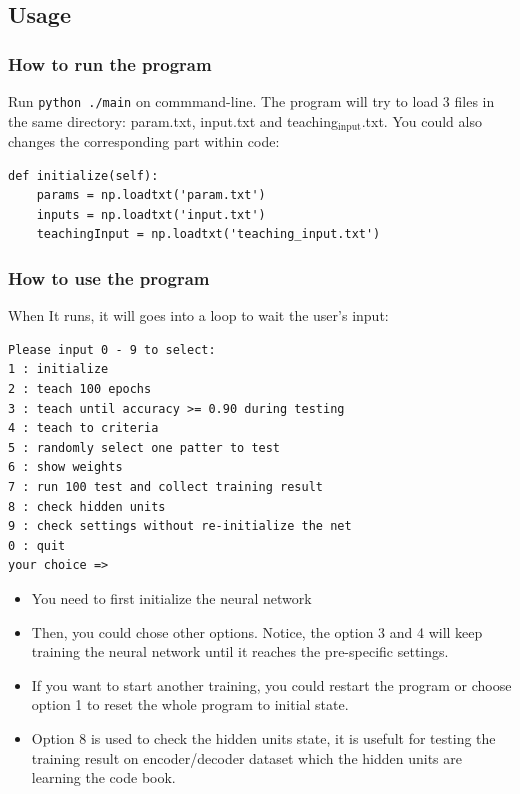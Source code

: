 \documentclass[11pt]{article}
\begin{document}
\subsection{Usage}
\label{sec-5-2}
\subsubsection{How to run the program}
\label{sec-5-2-1}
Run \texttt{python ./main} on commmand-line.
The program will try to load 3 files in the same directory: param.txt, input.txt and teaching$_{\text{input}}$.txt. You could also changes the corresponding part within code:
\begin{verbatim}
def initialize(self):
    params = np.loadtxt('param.txt')
    inputs = np.loadtxt('input.txt')
    teachingInput = np.loadtxt('teaching_input.txt')
\end{verbatim}
\subsubsection{How to use the program}
\label{sec-5-2-2}
When It runs, it will goes into a loop to wait the user's input:
\begin{verbatim}
Please input 0 - 9 to select:
1 : initialize
2 : teach 100 epochs
3 : teach until accuracy >= 0.90 during testing
4 : teach to criteria
5 : randomly select one patter to test
6 : show weights
7 : run 100 test and collect training result
8 : check hidden units
9 : check settings without re-initialize the net
0 : quit
your choice =>
\end{verbatim}

\begin{itemize}
\item You need to first initialize the neural network
\item Then, you could chose other options. Notice, the option 3 and 4 will keep training the neural network until it reaches the pre-specific settings.
\item If you want to start another training, you could restart the program or choose option 1 to reset the whole program to initial state.
\item Option 8 is used to check the hidden units state, it is usefult for testing the training result on encoder/decoder dataset which the hidden units are learning the code book.
\end{itemize}
\end{document}
